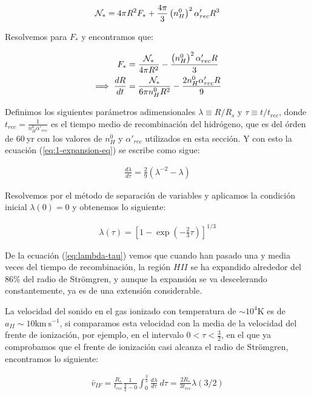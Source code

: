 \begin{align}
  \mathcal{N}_* = 4\pi R^2 F_* + \frac{4\pi}{3}\left(n^0_H\right)^2\alpha'_{rec}R^3
\end{align}

Resolvemos para $F_*$ y encontramos que:

\begin{align}
  F_* &= \frac{\mathcal{N}_*}{4\pi R^2} - \frac{\left(n^0_H\right)^2\alpha'_{rec} R}{3} \\
  \implies \frac{dR}{dt} &= \frac{\mathcal{N}_*}{6\pi n^0_H R^2} - \frac{2n^0_H \alpha'_{rec} R}{9} \label{eq:1-expansion-eq} 
\end{align}

Definimos los siguientes parámetros adimensionales $\lambda \equiv R/R_s$ y $\tau \equiv t/t_{rec}$, donde $t_{rec} = \frac{1}{n^0_H \alpha'_{rec}}$ es el tiempo medio de recombinación del hidrógeno, que es del órden de $60\mathrm{~yr}$ con los valores de $n^0_H$ y $\alpha'_{rec}$ utilizados en esta sección. Y con esto la ecuación (\ref{eq:1-expansion-eq}) se escribe como sigue:

\begin{align}
  \frac{d\lambda}{d\tau} = \frac{2}{9}\left(\lambda^{-2} - \lambda\right) \label{eq:d-lambda-tau}
\end{align}

Resolvemos por el método de separación de variables y aplicamos la condición inicial $\lambda(0) = 0$ y obtenemos lo siguiente:

\begin{align}
  \lambda(\tau) = \left[1 - \exp\left(-\frac{2}{3}\tau\right)\right]^{1/3} \label{eq:lambda-tau}
\end{align}

De la ecuación (\ref{eq:lambda-tau}) vemos que cuando han pasado una y media veces del tiempo de recombinación,  la región $HII$ se ha expandido alrededor del $86\mathrm{\%}$ del radio de Strömgren, y aunque la expansión se va descelerando constantemente, ya es de una extensión considerable.

La velocidad del sonido en el gas ionizado con temperatura de $\sim 10^4\mathrm{K}$ es de $a_{II}\sim 10\mathrm{km~s^{-1}}$, si comparamos esta velocidad con la media de la velocidad del frente de ionización, por ejemplo, en el intervalo $0< \tau < \frac{3}{2}$, en el que ya comprobamos que el frente de ionización casi alcanza el radio de Strömgren, encontramos lo siguiente:

\begin{align}
  \bar{v}_{IF} = \frac{R_s}{t_{rec}}\frac{1}{\frac{3}{2}- 0}\int^{\frac{3}{2}}_0 \frac{d\lambda}{d\tau}~d\tau = \frac{2R_s}{3t_{rec}}\lambda\left(3/2\right)
\end{align}

